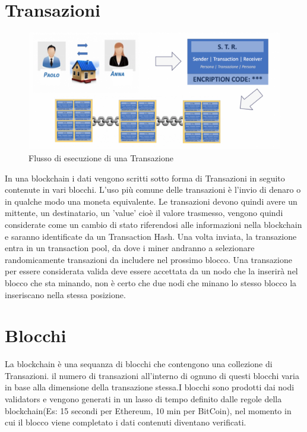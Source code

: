 \documentclass[12pt]{report}
\begin{document}
\section{Transazioni}
\begin{figure}[h]
	\includegraphics[width=\textwidth]{flusso_bc}
	\centering
	\caption{Flusso di esecuzione di una Transazione}
	\label{fig:fl_bc}
\end{figure}
In una blockchain i dati vengono scritti sotto forma di Transazioni in seguito contenute in vari blocchi. L'uso più comune delle transazioni è l'invio di denaro o in qualche modo una moneta equivalente. Le transazioni devono quindi avere un mittente, un destinatario, un 'value' cioè il valore trasmesso, vengono quindi considerate come un cambio di stato riferendosi alle informazioni nella blockchain e saranno identificate da un Transaction Hash. Una volta inviata, la transazione entra in un transaction pool, da dove i miner andranno a selezionare randomicamente transazioni da includere nel prossimo blocco. Una transazione per essere considerata valida deve essere accettata da un nodo che la inserirà nel blocco che sta minando, non è certo che due nodi che minano lo stesso blocco la inseriscano nella stessa posizione.

\section{Blocchi}
La blockchain è una sequanza di blocchi che contengono una collezione di Transazioni.  il numero di transazioni all'interno di ognuno di questi blocchi varia in base alla dimensione della transazione stessa.I blocchi sono prodotti dai nodi validators e vengono generati in un lasso di tempo definito dalle regole della blockchain(Es: 15 secondi per Ethereum, 10 min per BitCoin), nel momento in cui il blocco viene completato i dati contenuti diventano verificati.
\end{document}
